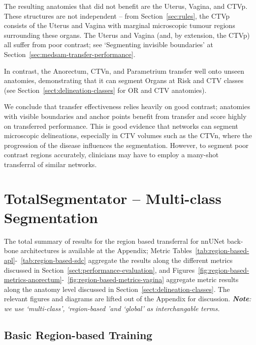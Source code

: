 \documentclass[11pt,twoside]{report}
\begin{document}
The resulting anatomies that did not benefit are the Uterus, Vagina, and CTVp. These structures are not independent -- from Section~\ref{sec:rules}, the CTVp consists of the Uterus and Vagina with marginal microscopic tumour regions surrounding these organs. The Uterus and Vagina (and, by extension, the CTVp) all suffer from poor contrast; see `Segmenting invisible boundaries' at Section~\ref{sec:medsam-transfer-performance}. 

In contrast, the Anorectum, CTVn, and Parametrium transfer well onto unseen anatomies, demonstrating that it can segment Organs at Risk and CTV classes (see Section~\ref{sect:delineation-classes} for OR and CTV anatomies).

We conclude that transfer effectiveness relies heavily on good contrast; anatomies with visible boundaries and anchor points benefit from transfer and score highly on transferred performance. This is good evidence that networks can segment microscopic delineations, especially in CTV volumes such as the CTVn, where the progression of the disease influences the segmentation. However, to segment poor contrast regions accurately, clinicians may have to employ a many-shot transferral of similar networks.

\section{TotalSegmentator -- Multi-class Segmentation}

The total summary of results for the region based transferral for nnUNet back-bone architectures is available at the Appendix; Metric Tables~\ref{tab:region-based-apl}-~\ref{tab:region-based-sdc} aggregate the results along the different metrics discussed in Section~\ref{sect:performance-evaluation}, and Figures~\ref{fig:region-based-metrics-anorectum}-~\ref{fig:region-based-metrics-vagina} aggregate metric results along the anatomy level discussed in Section~\ref{sect:delineation-classes}. The relevant figures and diagrams are lifted out of the Appendix for discussion. \textit{\textbf{Note}: we use `multi-class', `region-based 'and `global' as interchangable terms.}

\subsection{Basic Region-based Training}

\end{document}
